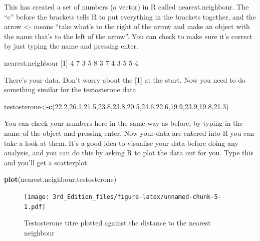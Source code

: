 \documentclass[
]{book}
\newenvironment{Shaded}{\begin{snugshade}}{\end{snugshade}}
\newcommand{\DecValTok}[1]{\textcolor[rgb]{0.00,0.00,0.81}{#1}}
\newcommand{\FloatTok}[1]{\textcolor[rgb]{0.00,0.00,0.81}{#1}}
\newcommand{\KeywordTok}[1]{\textcolor[rgb]{0.13,0.29,0.53}{\textbf{#1}}}
\newcommand{\NormalTok}[1]{#1}
\begin{document}
This has created a set of numbers (a vector) in R called nearest.neighbour. The ``c'' before the brackets tells R to put everything in the brackets together, and the arrow \textless- means ``take what's to the right of the arrow and make an object with the name that's to the left of the arrow''. You can check to make sure it's correct by just typing the name and pressing enter.

\begin{Shaded}
\begin{Highlighting}[]
\NormalTok{nearest.neighbour}
\NormalTok{ [}\DecValTok{1}\NormalTok{] }\DecValTok{4} \DecValTok{7} \DecValTok{3} \DecValTok{5} \DecValTok{8} \DecValTok{3} \DecValTok{7} \DecValTok{4} \DecValTok{3} \DecValTok{5} \DecValTok{5} \DecValTok{4}
\end{Highlighting}
\end{Shaded}

There's your data. Don't worry about the {[}1{]} at the start.
Now you need to do something similar for the testosterone data.

\begin{Shaded}
\begin{Highlighting}[]
\NormalTok{testosterone<-}\KeywordTok{c}\NormalTok{(}\FloatTok{22.2}\NormalTok{,}\FloatTok{26.1}\NormalTok{,}\FloatTok{21.5}\NormalTok{,}\FloatTok{23.8}\NormalTok{,}\FloatTok{23.8}\NormalTok{,}\FloatTok{20.5}\NormalTok{,}\FloatTok{24.6}\NormalTok{,}\FloatTok{22.6}\NormalTok{,}\FloatTok{19.9}\NormalTok{,}\FloatTok{23.9}\NormalTok{,}\FloatTok{19.8}\NormalTok{,}\FloatTok{21.3}\NormalTok{)}
\end{Highlighting}
\end{Shaded}

You can check your numbers here in the same way as before, by typing in the name of the object and pressing enter.
Now your data are entered into R you can take a look at them. It's a good idea to visualise your data before doing any analysis, and you can do this by asking R to plot the data out for you. Type this and you'll get a scatterplot.

\begin{Shaded}
\begin{Highlighting}[]
\KeywordTok{plot}\NormalTok{(nearest.neighbour,testosterone)}
\end{Highlighting}
\end{Shaded}

\begin{figure}
\centering
\texttt{[image: 3rd\_Edition\_files/figure-latex/unnamed-chunk-5-1.pdf]}
\caption{\label{fig:unnamed-chunk-5}Testosterone titre plotted against the distance to the nearest neighbour}
\end{figure}
\end{document}
